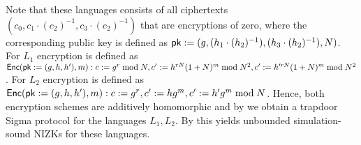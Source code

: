 Note that these languages consists of all ciphertexts $(c_0, c_1\cdot (c_2)^{-1}, c_3\cdot (c_2)^{-1})$ that are encryptions of zero, where the corresponding public key is defined as $\mathsf{pk}:=(g, (h_1\cdot (h_2)^{-1}), (h_3\cdot (h_2)^{-1}), N)$. For $L_1$ encryption is defined as $\mathsf{Enc}(\mathsf{pk}:=(g,h,h'),m): c:=g^r \bmod N, c':=h^{rN}(1+N)^m \bmod N^2, c':=h'^{rN}(1+N)^m \bmod N^2$. For $L_2$ encryption is defined as $\mathsf{Enc}(\mathsf{pk}:=(g,h,h'),m): c:=g^r, c':=hg^m, c':=h'g^m \bmod N$. Hence, both encryption schemes are additively homomorphic and by  we obtain a trapdoor Sigma protocol for the languages $L_1, L_2$. By  this yields unbounded simulation-sound NIZKs for these languages.








